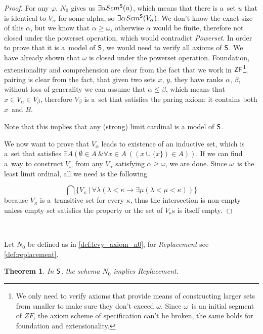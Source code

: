 \documentclass[12pt,a4paper]{article}
\newtheorem{theorem}{Theorem}[section]
\newenvironment{proof}
{\noindent \textit{Proof.}}
{\hspace*{\fill} $\Box$}
\newcommand{\then}{\rightarrow}
\begin{document}
\begin{proof}
For any $\varphi$, $N_0$ gives us $\exists u Scm^{\sf{S}}(u)$, which means that there is a~set $u$ that is identical to $V_\alpha$ for some alpha, so $\exists \alpha Scm^{\sf{S}}(V_\alpha)$.
We don't know the exact size of this $\alpha$, but we know that $\alpha \geq \omega$, otherwise $\alpha$ would be finite, therefore not closed under the powerset operation, which would contradict \emph{Powerset}. 
In order to prove that it is a~model of $\sf{S}$, we would need to verify all axioms of $\sf{S}$. We have already shown that $\omega$ is closed under the powerset operation. Foundation, extensionality and comprehension are clear from the fact that we work in $\sf{ZF}$\footnote{We only need to verify axioms that provide means of constructing larger sets from smaller to make sure they don't exceed $\omega$. Since $\omega$ is an initial segment of $ZF$, the axiom scheme of specification can't be broken, the same holds for foundation and extensionality.}, pairing is clear from the fact, that given two sets $x$, $y$, they have ranks $\alpha$, $\beta$, without loss of generality we can assume that $\alpha \leq \beta$, which means that $x \in V_\alpha \in V_\beta$, therefore $V_\beta$ is a~set that satisfies the paring axiom: it contains both $x$ and $B$.

Note that this implies that any (strong) limit cardinal is a model of $\sf{S}$.

We now want to prove that $V_\alpha$ leads to existence of an inductive set, which is a~set that satisfies $\exists A(\emptyset \in A~\& \forall  x \in A~((x \cup \{ x\}) \in A))$. If we can find a~way to construct $V_\omega$ from any $V_\alpha$ satisfying $\alpha \geq \omega$, we are done. Since $\omega$ is the least limit ordinal, all we need is the following

\begin{equation}
\bigcap \{V_\kappa\ |\  \forall \lambda(\lambda < \kappa \then \exists \mu(\lambda < \mu < \kappa))\}
\end{equation}
because $V_\kappa$ is a~transitive set for every $\kappa$, thus the intersection is non-empty unless empty set satisfies the property or the set of $V_\kappa$s is itself empty.
\end{proof}

\

Let $N_0$ be defined as in \ref{def:levy_axiom_n0}, for \emph{Replacement} see \ref{def:replacement}.
\begin{theorem}
In $\sf{S}$, the schema $N_0$ implies \emph{Replacement}.
\end{theorem}
\end{document}
